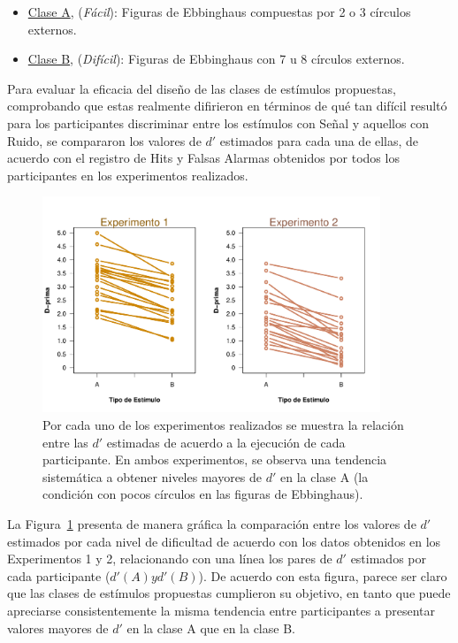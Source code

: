 \begin{itemize}
\item \underline{Clase A}, (\textit{Fácil}): Figuras de Ebbinghaus compuestas por 2 o 3 círculos externos.\\

\item \underline{Clase B}, (\textit{Difícil}): Figuras de Ebbinghaus con 7 u 8 círculos externos.\\
\end{itemize}

Para evaluar la eficacia del diseño de las clases de estímulos propuestas, comprobando que estas realmente difirieron en términos de qué tan difícil resultó para los participantes discriminar entre los estímulos con Señal y aquellos con Ruido, se compararon los valores de $d'$ estimados para cada una de ellas, de acuerdo con el registro de Hits y Falsas Alarmas obtenidos por todos los participantes en los experimentos realizados.\\

\begin{figure}[th]
\centering
\includegraphics[width=0.90\textwidth]{Figures/Diff_D_E1yE2}
\caption[Diferencias entre las $d'$ de los niveles de dificultad propuestos]{Por cada uno de los experimentos realizados se muestra la relación entre las $d'$ estimadas de acuerdo a la ejecución de cada participante. En ambos experimentos, se observa una tendencia sistemática a obtener niveles mayores de $d'$ en la clase A (la condición con pocos círculos en las figuras de Ebbinghaus).}
\label{fig:Diff_D}
\end{figure}

La Figura~\ref{fig:Diff_D} presenta de manera gráfica la comparación entre los valores de $d'$ estimados por cada nivel de dificultad de acuerdo con los datos obtenidos en los Experimentos 1 y 2, relacionando con una línea los pares de $d'$ estimados por cada participante ($d'(A) y d'(B)$). De acuerdo con esta figura, parece ser claro que las clases de estímulos propuestas cumplieron su objetivo, en tanto que puede apreciarse consistentemente la misma tendencia entre participantes a presentar valores mayores de $d'$ en la clase A que en la clase B.\\

